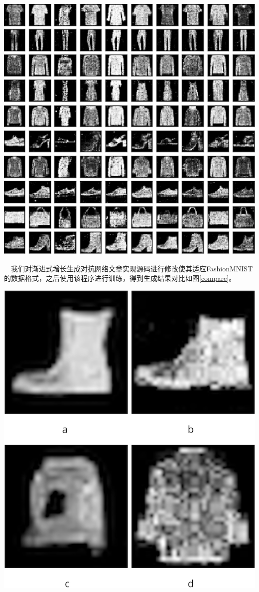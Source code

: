 \documentclass[portrait]{a0poster}
\begin{document}
\begin{multicols}{2}
\begin{CJK}{UTF8}{gbsn}
\begin{center}\vspace{1cm}
\includegraphics[width=1.0\linewidth]{500epoch.png}
\label{500epoch}
\end{center}\vspace{1cm}

\ \ 我们对渐进式增长生成对抗网络\supercite{DBLP:journals/corr/abs-1710-10196}文章实现源码进行修改使其适应FashionMNIST的数据格式，之后使用该程序进行训练，得到生成结果对比如图\ref{compare}。
\begin{center}\vspace{1cm}
\includegraphics[width=0.7\linewidth]{compare.png}
\label{compare}
\end{center}\vspace{1cm}


\end{CJK}
\end{multicols}
\end{document}
